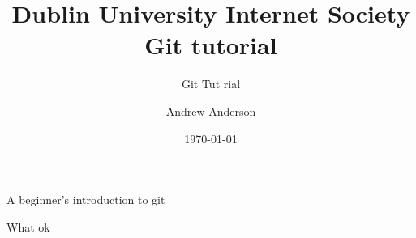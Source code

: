 \documentclass{beamer}
\begin{document}
\title[Netsoc Git Tutorial] {Dublin University Internet Society Git tutorial}
\author[A. Anderson \& C. Vize]{  \and Andrew Anderson }
\subtitle{Git Tut rial}{A beginner's introduction to git}
\date{\today}
\begin{frame}{What}
	ok
\end{frame}
\end{document}
